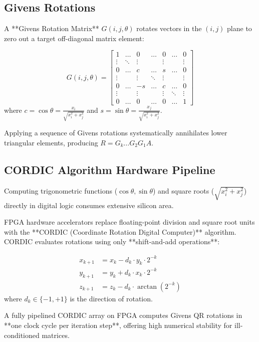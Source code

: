 \subsection{Givens Rotations}
A **Givens Rotation Matrix** $G(i, j, \theta)$ rotates vectors in the $(i, j)$ plane to zero out a target off-diagonal matrix element:

\begin{equation}
G(i, j, \theta) = \begin{bmatrix}
1 & \dots & 0 & \dots & 0 & \dots & 0 \\
\vdots & \ddots & \vdots & & \vdots & & \vdots \\
0 & \dots & c & \dots & s & \dots & 0 \\
\vdots & & \vdots & \ddots & \vdots & & \vdots \\
0 & \dots & -s & \dots & c & \dots & 0 \\
\vdots & & \vdots & & \vdots & \ddots & \vdots \\
0 & \dots & 0 & \dots & 0 & \dots & 1
\end{bmatrix}
\end{equation}
where $c = \cos\theta = \frac{x_i}{\sqrt{x_i^2 + x_j^2}}$ and $s = \sin\theta = \frac{x_j}{\sqrt{x_i^2 + x_j^2}}$.

Applying a sequence of Givens rotations systematically annihilates lower triangular elements, producing $R = G_k \dots G_2 G_1 A$.

\subsection{CORDIC Algorithm Hardware Pipeline}
Computing trigonometric functions ($\cos\theta, \sin\theta$) and square roots ($\sqrt{x_i^2 + x_j^2}$) directly in digital logic consumes extensive silicon area. 

FPGA hardware accelerators replace floating-point division and square root units with the **CORDIC (Coordinate Rotation Digital Computer)** algorithm. CORDIC evaluates rotations using only **shift-and-add operations**:

\begin{align}
x_{k+1} &= x_k - d_k \cdot y_k \cdot 2^{-k} \\
y_{k+1} &= y_k + d_k \cdot x_k \cdot 2^{-k} \\
z_{k+1} &= z_k - d_k \cdot \arctan(2^{-k})
\end{align}
where $d_k \in \{-1, +1\}$ is the direction of rotation. 

A fully pipelined CORDIC array on FPGA computes Givens QR rotations in **one clock cycle per iteration step**, offering high numerical stability for ill-conditioned matrices.


